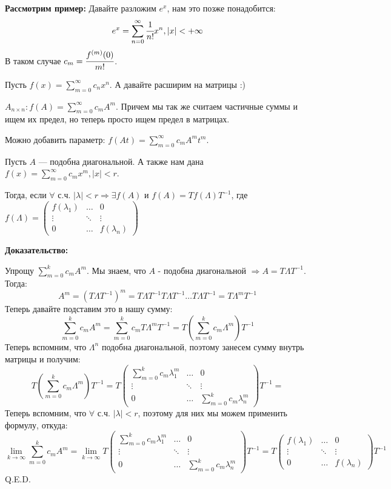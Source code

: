 \textbf{Рассмотрим пример:} Давайте разложим $e^x$, нам это позже понадобится:
$$e^x = \sum\limits_{n=0}^\infty\cfrac{1}{n!}x^n, |x| < + \infty$$
В таком случае $c_m = \cfrac{f^{(m)}(0)}{m!}$.

Пусть $f(x) = \sum\limits_{m=0}^\infty c_n x^n$. А давайте расширим на матрицы :)

 $A_{n\times n}: f(A) = \sum\limits_{m=0}^\infty c_mA^m$. Причем мы так же считаем частичные суммы и ищем их предел, но теперь просто ищем предел в матрицах.

Можно добавить параметр: $f(At) = \sum\limits_{m=0}^\infty c_mA^mt^m$.




Пусть $A$ --- подобна диагональной. А также нам дана $f(x) = \sum\limits_{m=0}^\infty c_m x^m, |x|<r$.

Тогда, если $\forall$ с.ч. $|\lambda|< r \Rightarrow \exists f(A)$ и $f(A) = T f(\Lambda) T^{-1}$, где
$f(\Lambda) = \begin{pmatrix}
    f(\lambda_1) & \ldots & 0\\
    \vdots & \ddots & \vdots \\
    0 & \ldots &f(\lambda_n)
\end{pmatrix}$

\textbf{Доказательство:}

Упрощу $\sum\limits_{m=0}^k    c_m A^m$. Мы знаем, что $A$ - подобна диагональной $ \Rightarrow A = T \Lambda T^{-1}$.  Тогда:
$$A^m = (T \Lambda T^{-1})^m = T \Lambda T^{-1} T \Lambda T^{-1} \ldots T \Lambda T^{-1} = T \Lambda^m T^{-1}$$
Теперь давайте подставим это в нашу сумму:
$$\sum\limits_{m=0}^k c_m A^m = \sum\limits_{m=0}^k c_mT \Lambda^m T^{-1} = T\left(\sum\limits_{m=0}^k c_m\Lambda^m\right)   T^{-1}$$
Теперь вспомним, что $\Lambda^n$ подобна диагональной, поэтому занесем сумму внутрь матрицы и получим:
$$T\left(\sum\limits_{m=0}^k c_m\Lambda^m\right) T^{-1} = T \begin{pmatrix}
    \sum\limits_{m=0}^k c_m\lambda_1^m & \ldots & 0 \\
    \vdots  & \ddots & \vdots \\
    0 & \ldots & \sum\limits_{m=0}^k c_m\lambda_n^m
\end{pmatrix}T^{-1} =$$
Теперь вспомним, что $\forall$ с.ч. $|\lambda|< r$, поэтому для них мы можем применить формулу, откуда:
$$\lim\limits_{k\rightarrow\infty}\sum\limits_{m=0}^k    c_m A^m=\lim\limits_{k\rightarrow\infty} T \begin{pmatrix}
    \sum\limits_{m=0}^k c_m\lambda_1^m & \ldots & 0 \\
    \vdots  & \ddots & \vdots \\
    0 & \ldots & \sum\limits_{m=0}^k c_m\lambda_n^m
\end{pmatrix}T^{-1} =T \begin{pmatrix}
    f(\lambda_1) & \ldots & 0 \\
    \vdots  & \ddots & \vdots \\
    0 & \ldots &  f(\lambda_n)
\end{pmatrix}T^{-1}$$
  \hfill Q.E.D.

